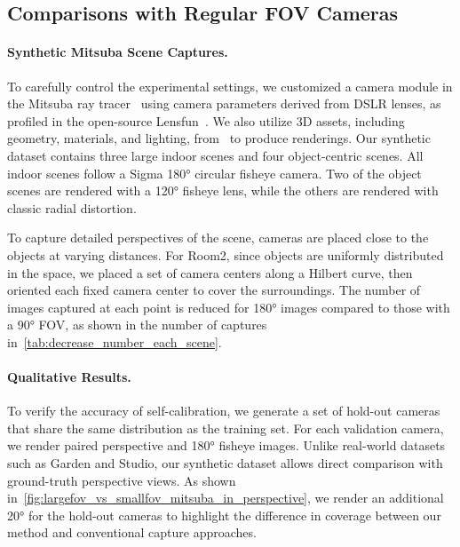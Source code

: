 \subsection{Comparisons with Regular FOV Cameras}
\paragraph{Synthetic Mitsuba Scene Captures.} To carefully control the experimental settings, we customized a camera module in the Mitsuba ray tracer~\cite{jakob2010mitsuba} using camera parameters derived from DSLR lenses, as profiled in the open-source Lensfun~\cite{lensfun}. 
We also utilize 3D assets, including geometry, materials, and lighting, from~\cite{resources16} to produce renderings.
Our synthetic dataset contains three large indoor scenes and four object-centric scenes. 
All indoor scenes follow a Sigma 180\si{\degree} circular fisheye camera. 
Two of the object scenes are rendered with a 120\si{\degree} fisheye lens, while the others are rendered with classic radial distortion. 

To capture detailed perspectives of the scene, cameras are placed close to the objects at varying distances. For Room2, since objects are uniformly distributed in the space, we placed a set of camera centers along a Hilbert curve, then oriented each fixed camera center to cover the surroundings. The number of images captured at each point is reduced for 180\si{\degree} images compared to those with a 90\si{\degree} FOV, as shown in the number of captures in~\cref{tab:decrease_number_each_scene}.








\paragraph{Qualitative Results.}
To verify the accuracy of self-calibration, we generate a set of hold-out cameras that share the same distribution as the training set. For each validation camera, we render paired perspective and 180\si{\degree} fisheye images. Unlike real-world datasets such as Garden and Studio, our synthetic dataset allows direct comparison with ground-truth perspective views. As shown in~\cref{fig:largefov_vs_smallfov_mitsuba_in_perspective}, we render an additional 20\si{\degree} for the hold-out cameras to highlight the difference in coverage between our method and conventional capture approaches.

